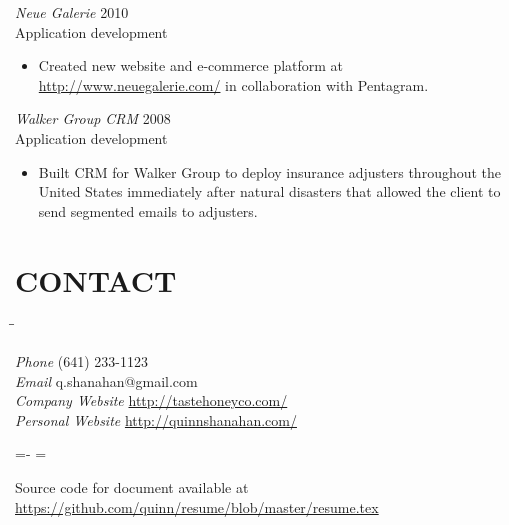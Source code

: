 \documentclass[line,margin]{res}
\begin{document}
\begin{resume}
\begin{itemize}
    \end{itemize}

    {\sl Neue Galerie}
    \hfill 2010 \\
    Application development
    \begin{itemize} \itemsep -2pt
        \item
            Created new website and e-commerce platform at
            \mbox{\url{http://www.neuegalerie.com/}} in collaboration with
            Pentagram.

    \end{itemize}

    \begin{samepage}
    {\sl Walker Group CRM}
    \hfill 2008 \\
    Application development
    \begin{itemize} \itemsep -2pt
        \item
            Built CRM for Walker Group to deploy insurance adjusters
            throughout the United States immediately after natural disasters
            that allowed the client to send segmented emails to adjusters.

    \end{itemize}
    \end{samepage}

\section{CONTACT}
    \vspace{-2.3ex}
    \begin{tabbing}
    \hspace{1.5in}\= \hspace{2.0in}\= \kill

    {\sl Phone}            \> (641) 233-1123 \\
    {\sl Email}            \> q.shanahan@gmail.com \\
    {\sl Company Website}  \> \url{http://tastehoneyco.com/} \\
    {\sl Personal Website} \> \url{http://quinnshanahan.com/} \\

    \end{tabbing}

\vfill
\leftskip=-\hoffset
\advance\textwidth\hoffset
\hsize=\textwidth
\fullline
\vskip 2pt

Source code for document available at
\url{https://github.com/quinn/resume/blob/master/resume.tex}

\end{resume}
\end{document}
